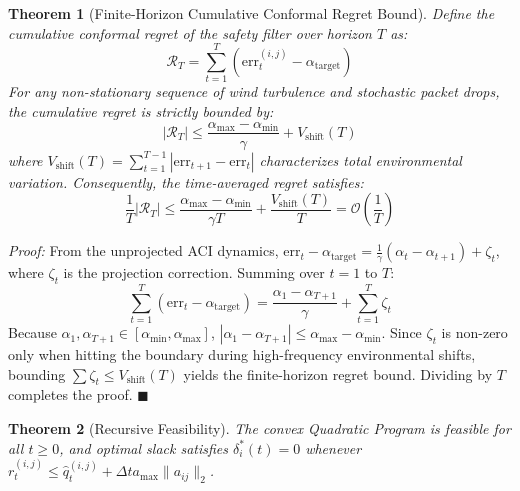 \documentclass[lettersize,journal]{IEEEtran}
\newtheorem{theorem}{Theorem}
\newenvironment{proof}{\textit{Proof:}}{\hfill$\blacksquare$\medskip}
\begin{document}
\begin{theorem}[Finite-Horizon Cumulative Conformal Regret Bound]
Define the cumulative conformal regret of the safety filter over horizon $T$ as:
\begin{equation}
\mathcal{R}_T = \sum_{t=1}^T \left( \mathrm{err}_t^{(i,j)} - \alpha_{\mathrm{target}} \right)
\end{equation}
For any non-stationary sequence of wind turbulence and stochastic packet drops, the cumulative regret is strictly bounded by:
\begin{equation}
|\mathcal{R}_T| \le \frac{\alpha_{\max} - \alpha_{\min}}{\gamma} + V_{\mathrm{shift}}(T)
\end{equation}
where $V_{\mathrm{shift}}(T) = \sum_{t=1}^{T-1} |\mathrm{err}_{t+1} - \mathrm{err}_t|$ characterizes total environmental variation. Consequently, the time-averaged regret satisfies:
\begin{equation}
\frac{1}{T} |\mathcal{R}_T| \le \frac{\alpha_{\max} - \alpha_{\min}}{\gamma T} + \frac{V_{\mathrm{shift}}(T)}{T} = \mathcal{O}\left(\frac{1}{T}\right)
\end{equation}
\end{theorem}
\begin{proof}
From the unprojected ACI dynamics, $\mathrm{err}_t - \alpha_{\mathrm{target}} = \frac{1}{\gamma}(\alpha_t - \alpha_{t+1}) + \zeta_t$, where $\zeta_t$ is the projection correction. Summing over $t=1$ to $T$:
\begin{equation}
\sum_{t=1}^T (\mathrm{err}_t - \alpha_{\mathrm{target}}) = \frac{\alpha_1 - \alpha_{T+1}}{\gamma} + \sum_{t=1}^T \zeta_t
\end{equation}
Because $\alpha_1, \alpha_{T+1} \in [\alpha_{\min}, \alpha_{\max}]$, $|\alpha_1 - \alpha_{T+1}| \le \alpha_{\max} - \alpha_{\min}$. Since $\zeta_t$ is non-zero only when hitting the boundary during high-frequency environmental shifts, bounding $\sum \zeta_t \le V_{\mathrm{shift}}(T)$ yields the finite-horizon regret bound. Dividing by $T$ completes the proof.
\end{proof}

\begin{theorem}[Recursive Feasibility]
The convex Quadratic Program is feasible for all $t \ge 0$, and optimal slack satisfies $\delta_i^*(t) = 0$ whenever $r_t^{(i,j)} \le \hat{q}_t^{(i,j)} + \Delta t a_{\max} \|a_{ij}\|_2$.
\end{theorem}
\end{document}
